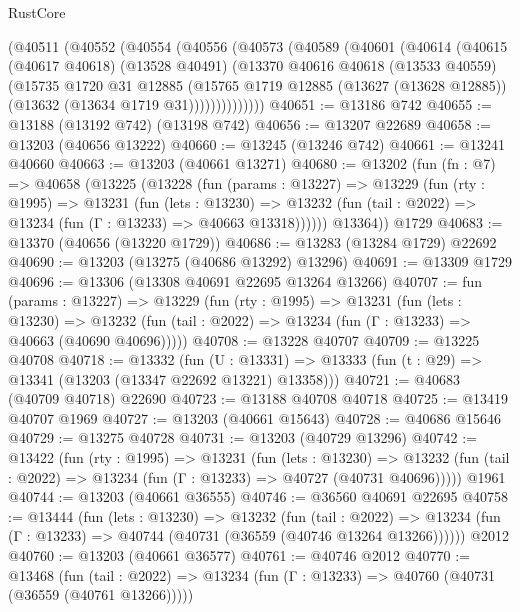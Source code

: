 \begin{lexlean}{RustCore}
\begin{coremodule}
    (@40511
      (@40552
        (@40554
          (@40556
            (@40573
              (@40589
                (@40601
                  (@40614
                    (@40615
                      (@40617 @40618)
                      (@13528 @40491)
                      (@13370
                        @40616
                        @40618
                        (@13533 @40559)
                        (@15735
                          @1720
                          @31
                          @12885
                          (@15765
                            @1719
                            @12885
                            (@13627 (@13628 @12885))
                            (@13632 (@13634 @1719 @31))))))))))))))
@40651 := @13186 @742
@40655 := @13188 (@13192 @742) (@13198 @742)
@40656 := @13207 @22689
@40658 := @13203 (@40656 @13222)
@40660 := @13245 (@13246 @742)
@40661 := @13241 @40660
@40663 := @13203 (@40661 @13271)
@40680 := @13202
    (fun (fn : @7) =>
    @40658
      (@13225
        (@13228
          (fun (params : @13227) =>
          @13229
            (fun (rty : @1995) =>
            @13231
              (fun (lets : @13230) =>
              @13232 (fun (tail : @2022) => @13234 (fun (Γ : @13233) => @40663 @13318))))))
        @13364))
    @1729
@40683 := @13370 (@40656 (@13220 @1729))
@40686 := @13283 (@13284 @1729) @22692
@40690 := @13203 (@13275 (@40686 @13292) @13296)
@40691 := @13309 @1729
@40696 := @13306 (@13308 @40691 @22695 @13264 @13266)
@40707 := fun (params : @13227) =>
  @13229
    (fun (rty : @1995) =>
    @13231
      (fun (lets : @13230) =>
      @13232 (fun (tail : @2022) => @13234 (fun (Γ : @13233) => @40663 (@40690 @40696)))))
@40708 := @13228 @40707
@40709 := @13225 @40708
@40718 := @13332
    (fun (U : @13331) => @13333 (fun (t : @29) => @13341 (@13203 (@13347 @22692 @13221) @13358)))
@40721 := @40683 (@40709 @40718) @22690
@40723 := @13188 @40708 @40718
@40725 := @13419 @40707 @1969
@40727 := @13203 (@40661 @15643)
@40728 := @40686 @15646
@40729 := @13275 @40728
@40731 := @13203 (@40729 @13296)
@40742 := @13422
    (fun (rty : @1995) =>
    @13231
      (fun (lets : @13230) =>
      @13232 (fun (tail : @2022) => @13234 (fun (Γ : @13233) => @40727 (@40731 @40696)))))
    @1961
@40744 := @13203 (@40661 @36555)
@40746 := @36560 @40691 @22695
@40758 := @13444
    (fun (lets : @13230) =>
    @13232
      (fun (tail : @2022) =>
      @13234 (fun (Γ : @13233) => @40744 (@40731 (@36559 (@40746 @13264 @13266))))))
    @2012
@40760 := @13203 (@40661 @36577)
@40761 := @40746 @2012
@40770 := @13468
    (fun (tail : @2022) => @13234 (fun (Γ : @13233) => @40760 (@40731 (@36559 (@40761 @13266)))))

\end{coremodule}
\end{lexlean}
